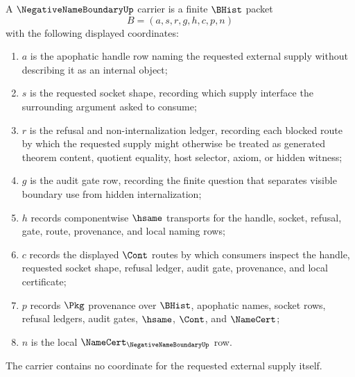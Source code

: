 \begin{definition}
\label{def:negative-name-boundary-carrier}
A $\NegativeNameBoundaryUp$ carrier is a finite $\BHist$ packet
$$
B=(a,s,r,g,h,c,p,n)
$$
with the following displayed coordinates:
\begin{enumerate}
\item $a$ is the apophatic handle row naming the requested external supply without describing it as an internal object;
\item $s$ is the requested socket shape, recording which supply interface the surrounding argument asked to consume;
\item $r$ is the refusal and non-internalization ledger, recording each blocked route by which the requested supply might otherwise be treated as generated theorem content, quotient equality, host selector, axiom, or hidden witness;
\item $g$ is the audit gate row, recording the finite question that separates visible boundary use from hidden internalization;
\item $h$ records componentwise $\hsame$ transports for the handle, socket, refusal, gate, route, provenance, and local naming rows;
\item $c$ records the displayed $\Cont$ routes by which consumers inspect the handle, requested socket shape, refusal ledger, audit gate, provenance, and local certificate;
\item $p$ records $\Pkg$ provenance over $\BHist$, apophatic names, socket rows, refusal ledgers, audit gates, $\hsame$, $\Cont$, and $\NameCert$;
\item $n$ is the local $\NameCert_{\NegativeNameBoundaryUp}$ row.
\end{enumerate}
The carrier contains no coordinate for the requested external supply itself.
\end{definition}

